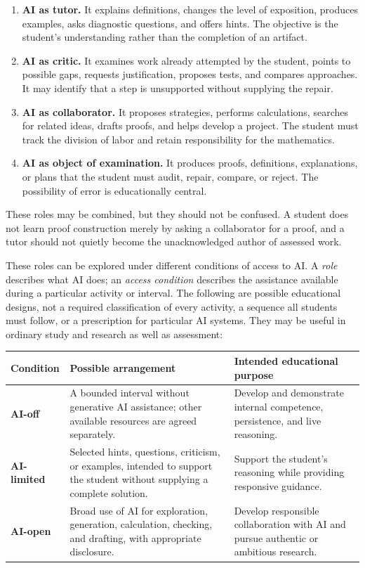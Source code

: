 \documentclass[11pt]{article}
\begin{document}
\begin{enumerate}
    \item \textbf{AI as tutor.} It explains definitions, changes the level of exposition,
    produces examples, asks diagnostic questions, and offers hints.  The objective is the
    student's understanding rather than the completion of an artifact.

    \item \textbf{AI as critic.} It examines work already attempted by the student,
    points to possible gaps, requests justification, proposes tests, and compares
    approaches.  It may identify that a step is unsupported without supplying the repair.

    \item \textbf{AI as collaborator.} It proposes strategies, performs calculations,
    searches for related ideas, drafts proofs, and helps develop a project.  The student
    must track the division of labor and retain responsibility for the mathematics.

    \item \textbf{AI as object of examination.} It produces proofs, definitions,
    explanations, or plans that the student must audit, repair, compare, or reject.  The
    possibility of error is educationally central.
\end{enumerate}

These roles may be combined, but they should not be confused.  A student does not learn
proof construction merely by asking a collaborator for a proof, and a tutor should not
quietly become the unacknowledged author of assessed work.

These roles can be explored under different conditions of access to AI. A \emph{role}
describes what AI does; an \emph{access condition} describes the assistance available
during a particular activity or interval. The following are possible educational
designs, not a required classification of every activity, a sequence all students must
follow, or a prescription for particular AI systems. They may be useful in ordinary
study and research as well as assessment:

\begin{center}
\begin{tabularx}{\textwidth}{>{\bfseries}p{}Y Y}
\toprule
Condition & Possible arrangement & Intended educational purpose \\
\midrule
AI-off & A bounded interval without generative AI assistance; other available resources
are agreed separately. & Develop and demonstrate internal competence, persistence, and
live reasoning. \\
AI-limited & Selected hints, questions, criticism, or examples, intended to support the
student without supplying a complete solution. & Support the student's reasoning while
providing responsive guidance. \\
AI-open & Broad use of AI for exploration, generation, calculation, checking, and drafting,
with appropriate disclosure. & Develop responsible collaboration with AI and pursue
authentic or ambitious research. \\
\bottomrule
\end{tabularx}
\end{center}
\end{document}
